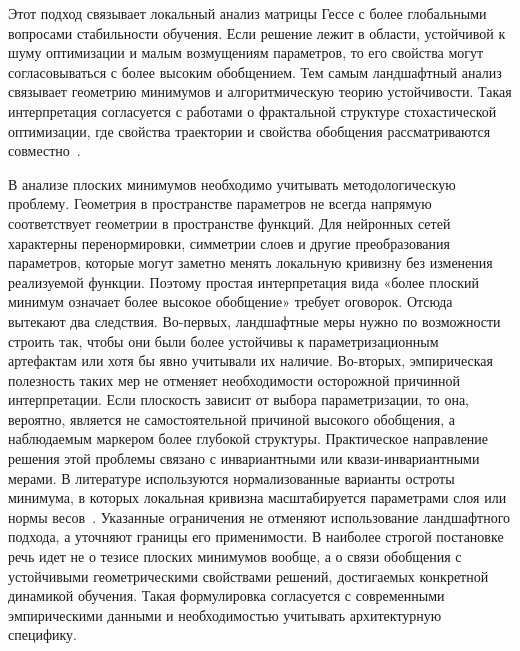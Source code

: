 Этот подход связывает локальный анализ матрицы Гессе с более глобальными вопросами стабильности обучения.
Если решение лежит в области, устойчивой к шуму оптимизации и малым возмущениям параметров, то его свойства могут согласовываться с более высоким обобщением.
Тем самым ландшафтный анализ связывает геометрию минимумов и алгоритмическую теорию устойчивости.
Такая интерпретация согласуется с работами о фрактальной структуре стохастической оптимизации, где свойства траектории и свойства обобщения рассматриваются совместно~\cite{fractal2019sgd}.

В анализе плоских минимумов необходимо учитывать методологическую проблему. Геометрия в пространстве параметров не всегда напрямую соответствует геометрии в пространстве функций.
Для нейронных сетей характерны перенормировки, симметрии слоев и другие преобразования параметров, которые могут заметно менять локальную кривизну без изменения реализуемой функции.
Поэтому простая интерпретация вида «более плоский минимум означает более высокое обобщение» требует оговорок.
Отсюда вытекают два следствия.
Во-первых, ландшафтные меры нужно по возможности строить так, чтобы они были более устойчивы к параметризационным артефактам или хотя бы явно учитывали их наличие.
Во-вторых, эмпирическая полезность таких мер не отменяет необходимости осторожной причинной интерпретации.
Если плоскость зависит от выбора параметризации, то она, вероятно, является не самостоятельной причиной высокого обобщения, а наблюдаемым маркером более глубокой структуры.
Практическое направление решения этой проблемы связано с инвариантными или квази-инвариантными мерами. В литературе используются нормализованные варианты остроты минимума, в которых локальная кривизна масштабируется параметрами слоя или нормы весов~\cite{normalizedflat2019}.
Указанные ограничения не отменяют использование ландшафтного подхода, а уточняют границы его применимости.
В наиболее строгой постановке речь идет не о тезисе плоских минимумов вообще, а о связи обобщения с устойчивыми геометрическими свойствами решений, достигаемых конкретной динамикой обучения.
Такая формулировка согласуется с современными эмпирическими данными и необходимостью учитывать архитектурную специфику.

